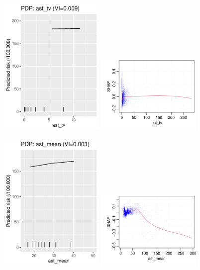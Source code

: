 \documentclass[12pt]{article}
\begin{document}
\begin{figure}[h]
\centering
\includegraphics[width=0.45\textwidth]{figures/pdp/ast_tv.pdf}
\includegraphics[width=0.45\textwidth]{figures/shap/ast_tv.pdf}
\end{figure}
\begin{figure}[h]
\centering
\includegraphics[width=0.45\textwidth]{figures/pdp/ast_mean.pdf}
\includegraphics[width=0.45\textwidth]{figures/shap/ast_mean.pdf}
\end{figure}
\end{document}
